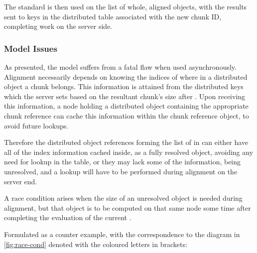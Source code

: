 The standard  is then used on the list of whole, aligned objects, with the results sent to keys in the distributed table associated with the new chunk ID, completing work on the server side.

\subsubsection{Model Issues}

As presented, the model suffers from a fatal flaw when used asynchronously.
Alignment necessarily depends on knowing the indices of where in a distributed object a chunk belongs.
This information is attained from the distributed keys which the server sets based on the resultant chunk's size after .
Upon receiving this information, a node holding a distributed object containing the appropriate chunk reference can cache this information within the chunk reference object, to avoid future lookups.

Therefore the distributed object references forming the list of  in  can either have all of the index information cached inside, as a fully resolved object, avoiding any need for lookup in the table, or they may lack some of the information, being unresolved, and a lookup will have to be performed during alignment on the server end.

A race condition arises when the size of an unresolved object is needed during alignment, but that object is to be computed on that same node some time after completing the evaluation of the current .

Formulated as a counter example, with the correspondence to the diagram in \cref{fig:race-cond} denoted with the coloured letters in brackets:


